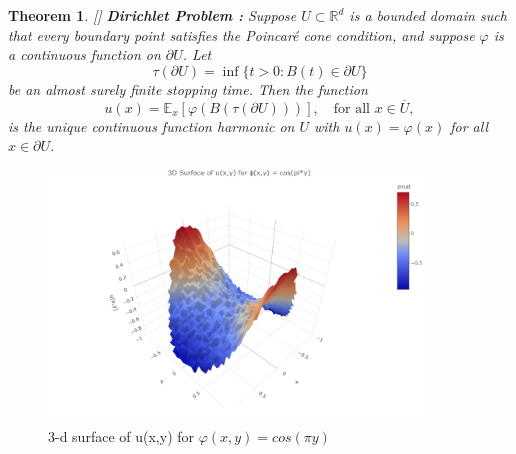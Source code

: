 \documentclass[11pt, a4paper, oneside]{report}
\numberwithin{equation}{section}
\newtheorem{theorem}{Theorem}[chapter]
\begin{document}
\begin{theorem}\label{Dirichlet-problem}
[{\cite[Theorem 3.12]{PeresMortersBook}}]
\textbf{Dirichlet Problem :} Suppose \( U \subset \mathbb{R}^d \) is a bounded domain such that every boundary point satisfies the Poincaré cone condition, and suppose \( \varphi \) is a continuous function on \( \partial U \). Let 
\[
\tau(\partial U) = \inf\{ t > 0 : B(t) \in \partial U \}
\]
be an almost surely finite stopping time. Then the function
\[
u(x) = \mathbb{E}_x[\varphi(B(\tau(\partial U)))], \quad \text{for all } x \in \overline{U},
\]
is the unique continuous function harmonic on \( U \) with \( u(x) = \varphi(x) \) for all \( x \in \partial U \).

\end{theorem}
\begin{figure}[htbp]
    \centering
    \includegraphics[width=0.9\textwidth]{dirichlet.png}
    \caption{3-d surface of u(x,y) for  $\varphi(x,y)= cos (\pi y)$}
\end{figure}
\end{document}
